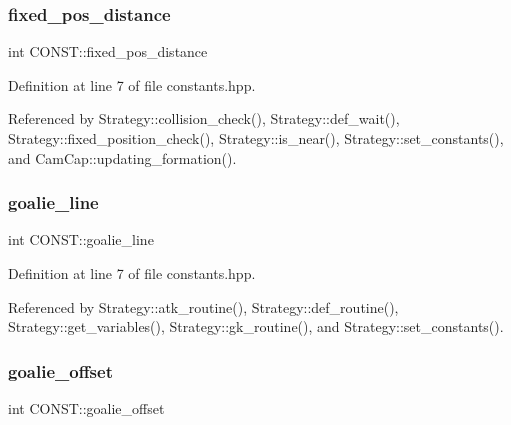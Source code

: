 \subsubsection{\texorpdfstring{fixed\+\_\+pos\+\_\+distance}{fixed\_pos\_distance}}
{\footnotesize\ttfamily int C\+O\+N\+S\+T\+::fixed\+\_\+pos\+\_\+distance\hspace{0.3cm}{\ttfamily [static]}}



Definition at line 7 of file constants.\+hpp.



Referenced by Strategy\+::collision\+\_\+check(), Strategy\+::def\+\_\+wait(), Strategy\+::fixed\+\_\+position\+\_\+check(), Strategy\+::is\+\_\+near(), Strategy\+::set\+\_\+constants(), and Cam\+Cap\+::updating\+\_\+formation().

\mbox{\label{namespace_c_o_n_s_t_a0091cb614eeaed41acd8997e9f9c9c0c}} 
\subsubsection{\texorpdfstring{goalie\+\_\+line}{goalie\_line}}
{\footnotesize\ttfamily int C\+O\+N\+S\+T\+::goalie\+\_\+line\hspace{0.3cm}{\ttfamily [static]}}



Definition at line 7 of file constants.\+hpp.



Referenced by Strategy\+::atk\+\_\+routine(), Strategy\+::def\+\_\+routine(), Strategy\+::get\+\_\+variables(), Strategy\+::gk\+\_\+routine(), and Strategy\+::set\+\_\+constants().

\mbox{\label{namespace_c_o_n_s_t_a75c38666c7edbca23d10a3fc651865a4}} 
\subsubsection{\texorpdfstring{goalie\+\_\+offset}{goalie\_offset}}
{\footnotesize\ttfamily int C\+O\+N\+S\+T\+::goalie\+\_\+offset\hspace{0.3cm}{\ttfamily [static]}}



